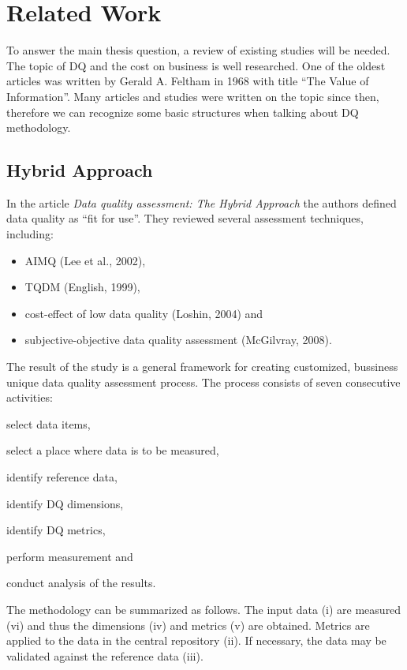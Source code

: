 \chapter{Related Work}\label{ch:related-work}

To answer the main thesis question, a review of existing studies will be needed.
The topic of DQ and the cost on business is well researched.
One of the oldest articles was written by Gerald A. Feltham in 1968 with title \enquote{The Value of Information}.
Many articles and studies were written on the topic since then, therefore we can recognize some basic structures when talking about DQ methodology.

\section{Hybrid Approach}

In the article \textit{Data quality assessment: The Hybrid Approach} the authors defined data quality as \enquote{fit for use}.
They reviewed several assessment techniques, including:
\begin{itemize}
    \item AIMQ (Lee et al., 2002),
    \item TQDM (English, 1999),
    \item cost-effect of low data quality (Loshin, 2004) and
    \item subjective-objective data quality assessment (McGilvray, 2008).
\end{itemize}

The result of the study is a general framework for creating customized, bussiness unique data quality assessment process.
The process consists of seven consecutive activities:
\begin{enumerate*}[label=(\roman*)]
    \item select data items,
    \item select a place where data is to be measured,
    \item identify reference data,
    \item identify DQ dimensions,
    \item identify DQ metrics,
    \item perform measurement and
    \item conduct analysis of the results.
\end{enumerate*}

The methodology can be summarized as follows.
The input data (i) are measured (vi) and thus the dimensions (iv) and metrics (v) are obtained.
Metrics are applied to the data in the central repository (ii).
If necessary, the data may be validated against the reference data (iii).

